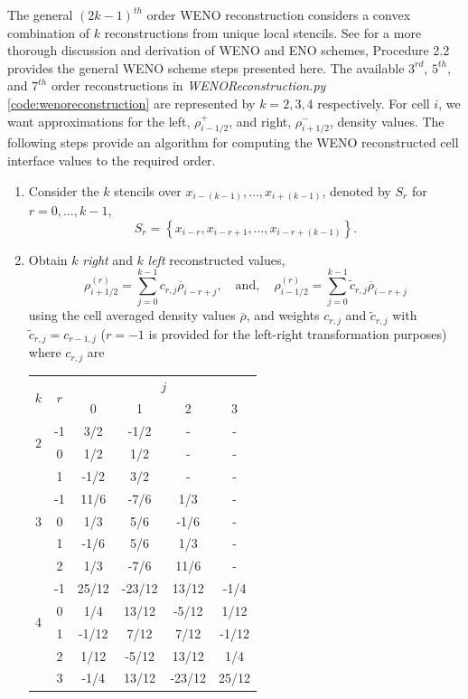 	The general $\left(2k-1\right)^{th}$ order WENO reconstruction considers a convex combination of $k$ reconstructions from unique local stencils. See \cite{Shu97} for a more thorough discussion and derivation of WENO and ENO schemes, Procedure 2.2 provides the general WENO scheme steps presented here. The available $3^{rd}$, $5^{th}$, and $7^{th}$ order reconstructions in \emph{WENOReconstruction.py} \ref{code:wenoreconstruction} are represented by $k=2,3,4$ respectively. For cell $i$, we want approximations for the left, $\rho^{+}_{i-1/2}$, and right, $\rho^{-}_{i+1/2}$, density values. The following steps provide an algorithm for computing the WENO reconstructed cell interface values to the required order.
\begin{enumerate}
	\item Consider the $k$ stencils over $x_{i-(k-1)},\hdots,x_{i+(k-1)}$, denoted by $S_r$ for $r=0,\hdots,k-1$,
		\begin{equation}
			S_r=\left\{x_{i-r}, x_{i-r+1},\hdots,x_{i-r+(k-1)}\right\}.
		\end{equation}
	\item Obtain $k$ \emph{right} and $k$ \emph{left} reconstructed values,
		\begin{equation}
			\rho^{(r)}_{i+1/2}=\sum_{j=0}^{k-1}c_{r,j}\overline\rho_{i-r+j},\quad\text{and},\quad \rho^{(r)}_{i-1/2}=\sum_{j=0}^{k-1}\tilde c_{r,j}\overline\rho_{i-r+j}
		\end{equation}
		using the cell averaged density values $\overline\rho$, and weights $c_{r,j}$ and $\tilde c_{r,j}$ with $\tilde c_{r,j}=c_{r-1,j}$ ($r=-1$ is provided for the left-right transformation purposes) where $c_{r,j}$ are
		\begin{center}
			\begin{tabular}{|c|c|cccc|}
				\hline
 				\multirow{2}{*}{$k$} & \multirow{2}{*}{$r$} & \multicolumn{4}{c|}{$j$} \\
 				 & & 0 & 1 & 2 & 3 \\
 				 \hline
 				\multirow{2}{*}{$2$} & -1 & 3/2 & -1/2 & - & - \\
 				& 0 & 1/2 & 1/2 & - & - \\
 				& 1 & -1/2 & 3/2 & - & - \\
 				 \hline
 				\multirow{3}{*}{$3$} & -1 & 11/6 & -7/6 & 1/3 & - \\
 				& 0 & 1/3 & 5/6 & -1/6 & - \\
 				& 1 & -1/6 & 5/6 & 1/3 & - \\
 				& 2 & 1/3 & -7/6 & 11/6 & - \\
 				\hline
 				\multirow{4}{*}{$4$} & -1 & 25/12 & -23/12 & 13/12 & -1/4 \\
 				& 0 & 1/4 & 13/12 & -5/12 & 1/12 \\
 				& 1 & -1/12 & 7/12 & 7/12 & -1/12 \\
 				& 2 & 1/12 & -5/12 & 13/12 & 1/4 \\
 				& 3 & -1/4 & 13/12 & -23/12 & 25/12 \\
 				\hline
			\end{tabular}
		\end{center}
	

\end{enumerate}
